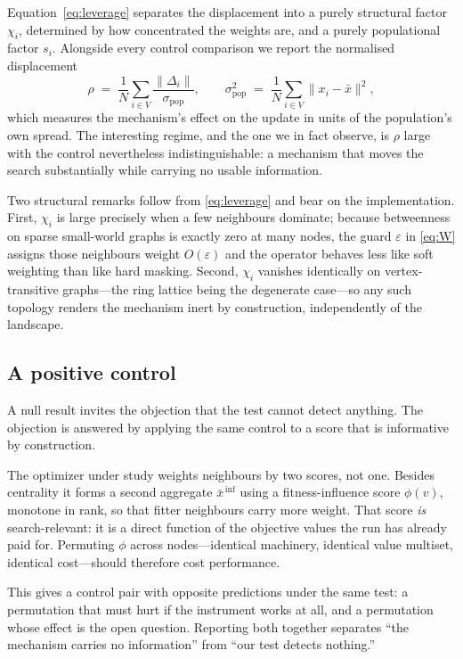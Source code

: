 Equation~\eqref{eq:leverage} separates the displacement into a purely
structural factor $\chi_i$, determined by how concentrated the weights are,
and a purely populational factor $s_i$. Alongside every control comparison we
report the normalised displacement
%
\begin{equation}
\label{eq:relshift}
\rho \;=\; \frac{1}{N}\sum_{i \in V} \frac{\|\Delta_i\|}{\sigma_{\mathrm{pop}}},
\qquad
\sigma_{\mathrm{pop}}^2 \;=\; \frac{1}{N}\sum_{i\in V}\bigl\|x_i-\bar{x}\bigr\|^2 ,
\end{equation}
%
which measures the mechanism's effect on the update in units of the
population's own spread. The interesting regime, and the one we in fact
observe, is $\rho$ large with the control nevertheless indistinguishable: a
mechanism that moves the search substantially while carrying no usable
information.

Two structural remarks follow from \eqref{eq:leverage} and bear on the
implementation. First, $\chi_i$ is large precisely when a few neighbours
dominate; because betweenness on sparse small-world graphs is exactly zero at
many nodes, the guard $\varepsilon$ in \eqref{eq:W} assigns those neighbours
weight $O(\varepsilon)$ and the operator behaves less like soft weighting than
like hard masking. Second, $\chi_i$ vanishes identically on vertex-transitive
graphs---the ring lattice being the degenerate case---so any such topology
renders the mechanism inert by construction, independently of the landscape.

\subsection{A positive control}
\label{sec:positive}

A null result invites the objection that the test cannot detect anything. The
objection is answered by applying the same control to a score that is
informative by construction.

The optimizer under study weights neighbours by two scores, not one. Besides
centrality it forms a second aggregate $\bar{x}^{\,\mathrm{inf}}$ using a
fitness-influence score $\phi(v)$, monotone in rank, so that fitter neighbours
carry more weight. That score \emph{is} search-relevant: it is a direct
function of the objective values the run has already paid for. Permuting
$\phi$ across nodes---identical machinery, identical value multiset, identical
cost---should therefore cost performance.

This gives a control pair with opposite predictions under the same test: a
permutation that must hurt if the instrument works at all, and a permutation
whose effect is the open question. Reporting both together separates ``the
mechanism carries no information'' from ``our test detects nothing.''

